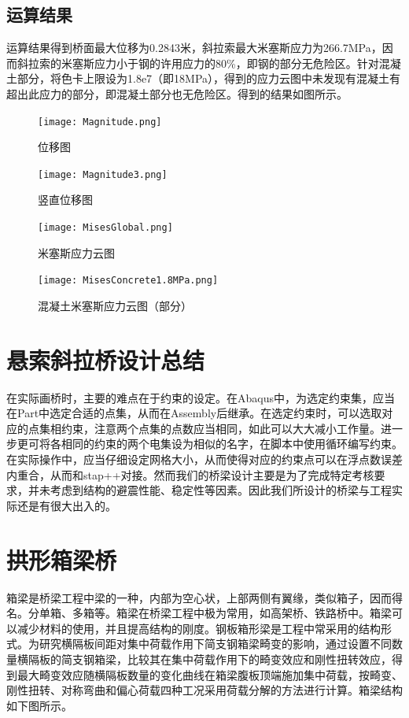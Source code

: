 \documentclass[forprint]{WHUBachelor}
\begin{document}
\subsection{运算结果}
运算结果得到桥面最大位移为0.2843米，斜拉索最大米塞斯应力为266.7MPa，因而斜拉索的米塞斯应力小于钢的许用应力的80\%，即钢的部分无危险区。针对混凝土部分，将色卡上限设为1.8e7（即18MPa），得到的应力云图中未发现有混凝土有超出此应力的部分，即混凝土部分也无危险区。得到的结果如图所示。

\begin{figure}[H]
\centering  
\texttt{[image: Magnitude.png]} 
\caption{位移图} 
\label{3-1} 
\end{figure}

\begin{figure}[H]
\centering  
\texttt{[image: Magnitude3.png]} 
\caption{竖直位移图} 
\label{3-1} 
\end{figure}

\begin{figure}[H]
\centering  
\texttt{[image: MisesGlobal.png]} 
\caption{米塞斯应力云图} 
\label{3-1} 
\end{figure}

\begin{figure}[H]
\centering  
\texttt{[image: MisesConcrete1.8MPa.png]} 
\caption{混凝土米塞斯应力云图（部分）} 
\label{3-1} 
\end{figure}

\section{悬索斜拉桥设计总结}
在实际画桥时，主要的难点在于约束的设定。在Abaqus中，为选定约束集，应当在Part中选定合适的点集，从而在Assembly后继承。在选定约束时，可以选取对应的点集相约束，注意两个点集的点数应当相同，如此可以大大减小工作量。进一步更可将各相同的约束的两个电集设为相似的名字，在脚本中使用循环编写约束。在实际操作中，应当仔细设定网格大小，从而使得对应的约束点可以在浮点数误差内重合，从而和stap++对接。然而我们的桥梁设计主要是为了完成特定考核要求，并未考虑到结构的避震性能、稳定性等因素。因此我们所设计的桥梁与工程实际还是有很大出入的。

\section{拱形箱梁桥}
箱梁是桥梁工程中梁的一种，内部为空心状，上部两侧有翼缘，类似箱子，因而得名。分单箱、多箱等。箱梁在桥梁工程中极为常用，如高架桥、铁路桥中。箱梁可以减少材料的使用，并且提高结构的刚度。钢板箱形梁是工程中常采用的结构形式。为研究横隔板间距对集中荷载作用下简支钢箱梁畸变的影响，通过设置不同数量横隔板的简支钢箱梁，比较其在集中荷载作用下的畸变效应和刚性扭转效应，得到最大畸变效应随横隔板数量的变化曲线在箱梁腹板顶端施加集中荷载，按畸变、刚性扭转、对称弯曲和偏心荷载四种工况采用荷载分解的方法进行计算。箱梁结构如下图所示。
\end{document}
